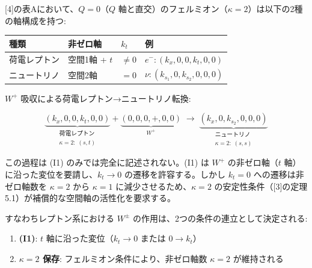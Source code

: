 \documentclass[
  a4paper,11pt]{ltjsarticle}
\newcounter{none}
\providecommand{\tightlist}{%
  \setlength{\itemsep}{0pt}\setlength{\parskip}{0pt}}
\theoremstyle{definition}
\theoremstyle{remark}
\begin{document}
{[}4{]}の表Aにおいて、\(Q = 0\)（\(Q\)
軸と直交）のフェルミオン（\(\kappa = 2\)）は以下の2種の軸構成を持つ:

{\def\LTcaptype{none} %
\begin{longtable}[]{@{}
  >{\raggedright\arraybackslash}p{}
  >{\raggedright\arraybackslash}p{}
  >{\raggedright\arraybackslash}p{}
  >{\raggedright\arraybackslash}p{}@{}}
\toprule\noalign{}
\begin{minipage}[b]{\linewidth}\raggedright
種類
\end{minipage} & \begin{minipage}[b]{\linewidth}\raggedright
非ゼロ軸
\end{minipage} & \begin{minipage}[b]{\linewidth}\raggedright
\(k_t\)
\end{minipage} & \begin{minipage}[b]{\linewidth}\raggedright
例
\end{minipage} \\
\midrule\noalign{}
\endhead
\bottomrule\noalign{}
\endlastfoot
荷電レプトン & 空間1軸 + \(t\) & \(\neq 0\) &
\(e^-: (k_x, 0, 0, k_t, 0, 0)\) \\
ニュートリノ & 空間2軸 & \(= 0\) &
\(\nu: (k_{s_1}, 0, k_{s_2}, 0, 0, 0)\) \\
\end{longtable}
}

\(W^+\) 吸収による荷電レプトン→ニュートリノ転換:

\[\underbrace{(k_x, 0, 0, k_t, 0, 0)}_{\substack{\text{荷電レプトン} \\ \kappa = 2:\; (s, t)}} + \underbrace{(0, 0, 0, +, 0, 0)}_{W^+} \;\longrightarrow\; \underbrace{(k_x, 0, k_{s_2}, 0, 0, 0)}_{\substack{\text{ニュートリノ} \\ \kappa = 2:\; (s, s)}}\]

この過程は (I1) のみでは完全に記述されない。(I1) は \(W^+\)
の非ゼロ軸（\(t\) 軸）に沿った変位を要請し、\(k_t \to 0\)
の遷移を許容する。しかし \(k_t = 0\) への遷移は非ゼロ軸数を
\(\kappa = 2\) から \(\kappa = 1\) に減少させるため、\(\kappa = 2\)
の安定性条件（{[}3{]}の定理5.1）が補償的な空間軸の活性化を要求する。

すなわちレプトン系における \(W^{\pm}\)
の作用は、2つの条件の連立として決定される:

\begin{enumerate}
\def\labelenumi{\arabic{enumi}.}
\tightlist
\item
  \textbf{(I1)}: \(t\) 軸に沿った変位（\(k_t \to 0\) または
  \(0 \to k_t\)）
\item
  \textbf{\(\kappa = 2\) 保存}: フェルミオン条件により、非ゼロ軸数
  \(\kappa = 2\) が維持される
\end{enumerate}
\end{document}
